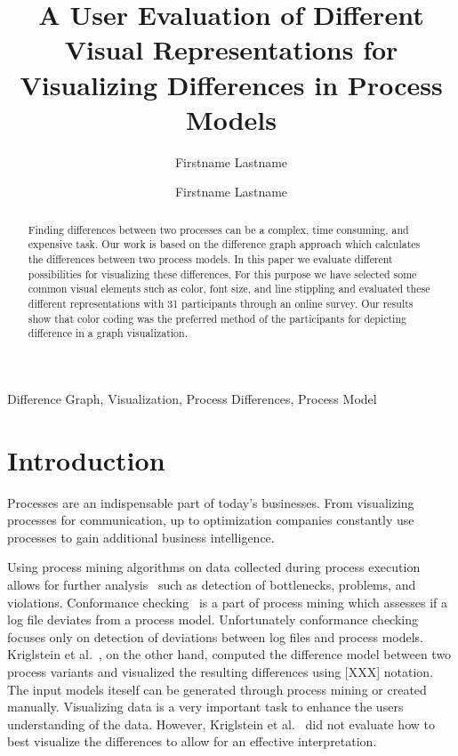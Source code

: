 \documentclass{llncs}
\begin{document}
\title{A User Evaluation of Different Visual Representations for Visualizing Differences in Process Models}

\author{Firstname Lastname \and Firstname Lastname}
\maketitle

\begin{abstract}
Finding differences between two processes can be a complex, time consuming, and expensive task. Our work is based on the difference graph approach which calculates the differences between two process models. In this paper we evaluate different possibilities for visualizing these differences. For this purpose we have selected some common visual elements such as color, font size, and line stippling and evaluated these different representations with 31 participants through an online survey. Our results show that color coding was the preferred method of the participants for depicting difference in a graph visualization.
\end{abstract}

\begin{keywords}
	Difference Graph, Visualization, Process Differences, Process Model
\end{keywords}

\section{Introduction}
\label{sec:Introduction} %

Processes are an indispensable part of today's businesses. From visualizing processes for communication, up to optimization companies constantly use processes to gain additional business intelligence.

Using process mining algorithms on data collected during process execution allows for further analysis~\cite{lit:PMDiscoveryConformanceEnhancement} such as detection of bottlenecks, problems, and violations. Conformance checking~\cite{lit:ConformanceCheckingOfProcesses} is a part of process mining which assesses if a log file deviates from a process model. Unfortunately conformance checking focuses only on detection of deviations between log files and process models. Kriglstein et al.~\cite{lit:VisuApprDiffAnalysis}, on the other hand, computed the difference model between two process variants and visualized the resulting differences using [XXX] notation. The input models iteself can be generated through process mining or created manually. Visualizing data is a very important task to enhance the users understanding of the data. However, Kriglstein et al.~\cite{lit:VisuApprDiffAnalysis} did not evaluate how to best visualize the differences to allow for an effective interpretation.
\end{document}
